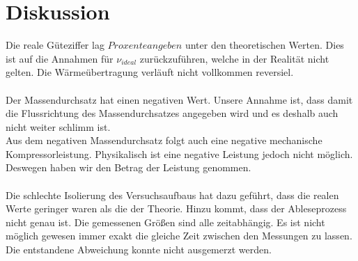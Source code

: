 \section{Diskussion}
\label{sec:Diskussion}

Die reale Güteziffer lag $Proxente angeben$ unter den theoretischen Werten. Dies ist auf die Annahmen für $ν_{ideal}$ zurückzuführen,
welche in der Realität nicht gelten. Die Wärmeübertragung verläuft nicht vollkommen reversiel.
\\
\\
Der Massendurchsatz hat einen negativen Wert. Unsere Annahme ist, dass damit die Flussrichtung des Massendurchsatzes angegeben wird 
und es deshalb auch nicht weiter schlimm ist.
\\
Aus dem negativen Massendurchsatz folgt auch eine negative mechanische Kompressorleistung. Physikalisch ist eine negative Leistung jedoch nicht möglich. 
Deswegen haben wir den Betrag der Leistung genommen.\\
\\
Die schlechte Isolierung des Versuchsaufbaus hat dazu geführt, dass die realen Werte geringer waren als die der Theorie.
Hinzu kommt, dass der Ableseprozess nicht genau ist.
Die gemessenen Größen sind alle zeitabhängig. Es ist nicht möglich gewesen immer exakt die gleiche Zeit zwischen den Messungen zu lassen.
Die entstandene Abweichung konnte nicht ausgemerzt werden.\\
\newpage